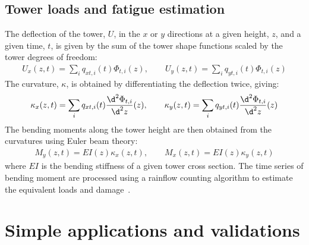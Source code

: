 \documentclass[wes, manuscript]{copernicus}
\begin{document}
\subsection{Tower loads and fatigue estimation}
\label{sec:Fatigue}
The deflection of the tower, $U$, in the $x$ or $y$ directions at a given height, $z$, and a given time, $t$, is given by the sum of the tower shape functions scaled by the tower degrees of freedom:
\begin{align}
   U_x(z,t) = \sum_i q_{xt,i}(t)  \Phi_{t,i}(z)
   ,
\qquad
   U_y(z,t) = \sum_i q_{yt,i}(t)  \Phi_{t,i}(z)
\end{align}
The curvature, $\kappa$, is obtained by differentiating the deflection twice, giving:
\begin{align}
   \kappa_x(z,t) = \sum_i q_{xt,i}(t)  \frac{\d^2\Phi_{t,i}}{\d^2z}(z)
   ,
\qquad
   \kappa_y(z,t) = \sum_i q_{yt,i}(t)  \frac{\d^2\Phi_{t,i}}{\d^2z}(z)
\end{align}
The bending moments along the tower height are then obtained from the curvatures using Euler beam theory:
\begin{align}
M_y(z,t)= EI(z) \kappa_x(z,t) 
   ,
\qquad
M_x(z,t)= EI(z) \kappa_y(z,t) 
\end{align}
where $EI$ is the bending stiffness of a given tower cross section.
The time series of bending moment are processed using a rainflow counting algorithm to estimate the equivalent loads and damage~\citep{IEC61400-3}.






\section{Simple applications and validations}
\label{sec:SimpleCases}
\end{document}
